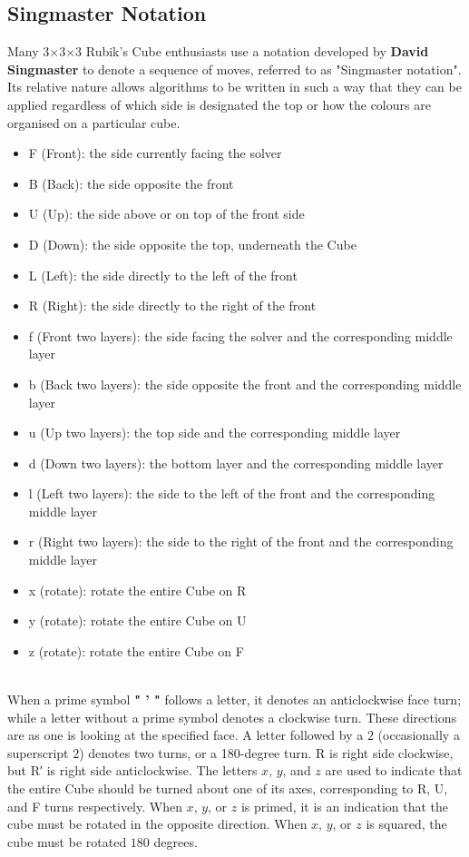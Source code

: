 \documentclass{article}
\begin{document}
\subsection{Singmaster Notation}
Many 3×3×3 Rubik's Cube enthusiasts use a notation developed by \textbf{David Singmaster} to denote a sequence of moves, referred to as "Singmaster notation".\cite{flath2003adventures} Its relative nature allows algorithms to be written in such a way that they can be applied regardless of which side is designated the top or how the colours are organised on a particular cube.
\begin{itemize}
    \item F (Front): the side currently facing the solver
    \item B (Back): the side opposite the front
    \item U (Up): the side above or on top of the front side
    \item D (Down): the side opposite the top, underneath the Cube
    \item L (Left): the side directly to the left of the front
    \item R (Right): the side directly to the right of the front
    \item f (Front two layers): the side facing the solver and the corresponding middle layer
    \item b (Back two layers): the side opposite the front and the corresponding middle layer
    \item u (Up two layers): the top side and the corresponding middle layer
    \item d (Down two layers): the bottom layer and the corresponding middle layer
    \item l (Left two layers): the side to the left of the front and the corresponding middle layer
    \item r (Right two layers): the side to the right of the front and the corresponding middle layer
    \item x (rotate): rotate the entire Cube on R
    \item y (rotate): rotate the entire Cube on U
    \item z (rotate): rotate the entire Cube on F
\end{itemize}\\
When a prime symbol \textbf{" ' "} follows a letter, it denotes an anticlockwise face turn; while a letter without a prime symbol denotes a clockwise turn. These directions are as one is looking at the specified face. A letter followed by a $2$ (occasionally a superscript $2$) denotes two turns, or a 180-degree turn. R is right side clockwise, but R′ is right side anticlockwise. The letters $x$, $y$, and $z$ are used to indicate that the entire Cube should be turned about one of its axes, corresponding to R, U, and F turns respectively. When $x$, $y$, or $z$ is primed, it is an indication that the cube must be rotated in the opposite direction. When $x$, $y$, or $z$ is squared, the cube must be rotated $180$ degrees.\\
\end{document}
